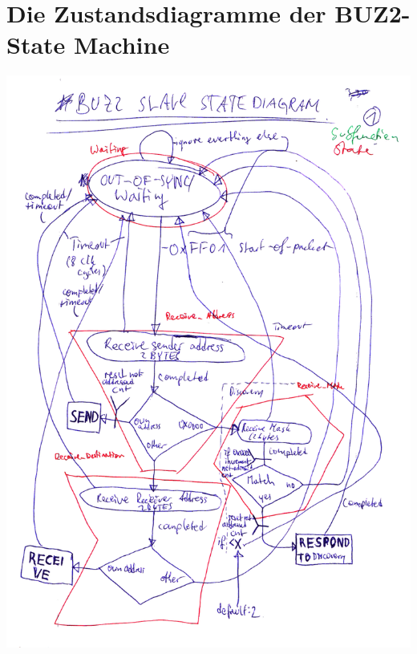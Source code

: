 \documentclass[12pt,a4paper,notitlepage]{article}
\begin{document}
\section{Die Zustandsdiagramme der BUZ2-State Machine}
\label{buz2_state_diagrams}
\begin{center}
\includegraphics[width=\textwidth]{images/image2_enhanced_small.png}
\newpage
{}

\end{center}
\end{document}
